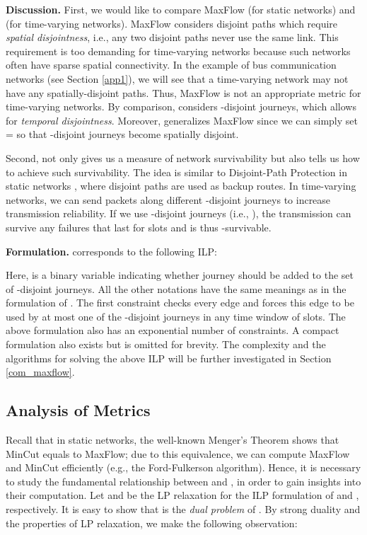 \documentclass[10pt, conference, letterpaper]{IEEEtran}
\begin{document}
\noindent \textbf{Discussion.} First, we would like to compare MaxFlow (for static networks) and  (for time-varying networks). MaxFlow considers disjoint paths which require \emph{spatial disjointness}, i.e., any two disjoint paths never use the same link. This requirement is too demanding for time-varying networks because such networks often have sparse spatial connectivity. In the example of bus communication networks (see Section \ref{app1}), we will see that a time-varying network may not have any spatially-disjoint paths. Thus, MaxFlow is not an appropriate metric for time-varying networks. By comparison,  considers -disjoint journeys, which allows for \emph{temporal disjointness}.  Moreover,   generalizes MaxFlow since we can simply set  =  so that -disjoint journeys become spatially disjoint.

Second,  not only gives us a measure of network survivability but also tells us how to achieve such survivability. The idea is similar to Disjoint-Path Protection in static networks \cite{dis_protect1}\cite{dis_protect2}, where disjoint paths are used as backup routes. In time-varying networks, we can send packets along different -disjoint journeys  to increase transmission reliability. If we use  -disjoint journeys (i.e., ), the transmission can survive any  failures that last for  slots and is thus -survivable.

\vspace{1mm}

\noindent \textbf{Formulation.}  corresponds to the following ILP:

Here,  is a binary variable indicating whether journey  should be added to the set of -disjoint journeys. All the other notations have the same meanings as in the formulation of . The first constraint checks every edge and forces this edge to be used by at most one of the -disjoint journeys in any time window of  slots. The above formulation also has an exponential number of constraints. A compact formulation also exists but is omitted for brevity. The complexity and the algorithms for solving the above ILP will be further investigated in Section \ref{com_maxflow}.

\subsection{Analysis of Metrics}\label{ana_metrics}
Recall that in static networks, the well-known Menger's Theorem shows that MinCut equals to MaxFlow; due to this equivalence, we can compute MaxFlow and MinCut efficiently (e.g., the Ford-Fulkerson algorithm). Hence, it is necessary to study the fundamental relationship between  and , in order to gain insights into their computation. Let  and  be the LP relaxation for the ILP formulation of  and , respectively. It is easy to show that   is the \emph{dual problem} of . By strong duality and the properties of LP relaxation, we make the following observation:
\vspace{-2mm}
\end{document}
